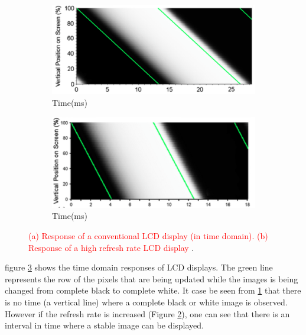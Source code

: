 \begin{figure}[htbp]
\centering
     \begin{subfigure}[b]{0.4\textwidth}
        \includegraphics[width=\textwidth]{./Template_Figures/LCD_refresh_low}
        \caption{ Time(ms)}\label{fig:response_low}
    \end{subfigure}
    \begin{subfigure}[b]{0.4\textwidth}
        \includegraphics[width=\textwidth]{./Template_Figures/LCD_refresh_high}
        \caption{ Time(ms)}\label{fig:response_high}
    \end{subfigure}

    \caption{\textcolor{red}{(a) Response of a conventional LCD display (in time domain). (b) Response of a high refresh rate LCD display }.  \label{fig:LCD_refresh}}
\end{figure}

figure \ref{fig:LCD_refresh} shows the time domain responses of LCD displays. The green line represents the row of the pixels that are being updated while the images is being changed from complete black to complete white. It case be seen from \ref{fig:response_low} that there is no time (a vertical line) where a complete black or white image is observed. However if the refresh rate is increased (Figure \ref{fig:response_high}), one can see that there is an interval in time where a stable image can be displayed.

